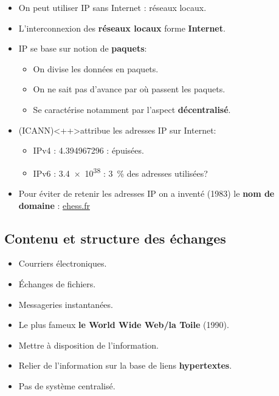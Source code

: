 \begin{slide}
	\begin{itemize}
		\item On peut utiliser IP sans Internet : réseaux locaux.
		\item L'interconnexion des \textbf{réseaux locaux} forme \textbf{Internet}.
		\item IP se base sur notion de \textbf{paquets}:
			\begin{itemize}
				\item On divise les données en paquets.
				\item On ne sait pas d'avance par où passent les paquets.
				\item Se caractérise notamment par l'aspect \textbf{décentralisé}.
			\end{itemize}
		\item {} (ICANN)<++>attribue les adresses IP sur Internet:
			\begin{itemize}
				\item IPv4 : \num{4,394967296} : épuisées.
				\item IPv6 : \num{3,4e38} : \SI{3}{\percent} des adresses utilisées?

			\end{itemize}
		\item Pour éviter de retenir les adresses IP on a inventé (1983) le \textbf{nom de domaine} : \url{ehess.fr}
	\end{itemize}
\end{slide}


\subsection{Contenu et structure des échanges} 

\begin{slide}
	\begin{itemize}
		\item Courriers électroniques.
		\item Échanges de fichiers.
		\item Messageries instantanées.
		\item Le plus fameux \textbf{le World Wide Web/la Toile} (1990).
	\end{itemize}
\end{slide}


\begin{slide}
	\begin{itemize}
		\item Mettre à disposition de l'information.
		\item Relier de l'information sur la base de liens \textbf{hypertextes}.
		\item Pas de système centralisé.
	\end{itemize}
\end{slide}

